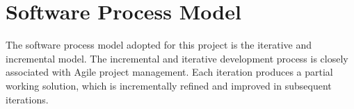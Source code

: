 \section{Software Process Model}
The software process model adopted for this project is the iterative and incremental model. The incremental
and iterative development process is closely associated with Agile project management. Each iteration produces
a partial working solution, which is incrementally refined and improved in subsequent iterations.

